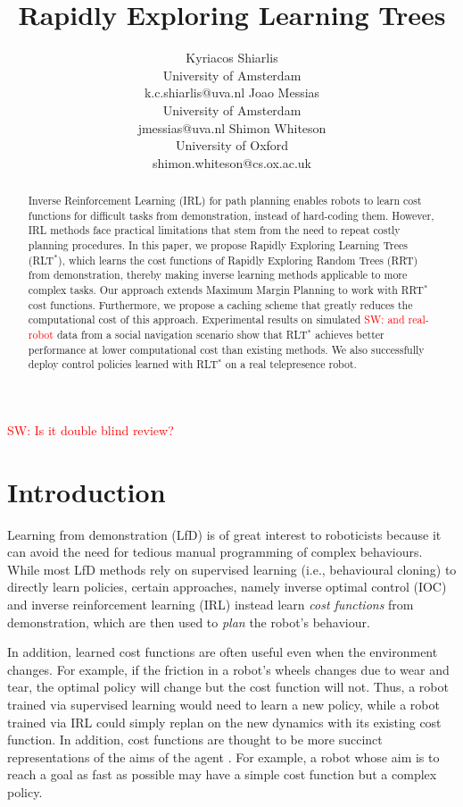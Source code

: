 \documentclass{article}  %
\title{\LARGE \bf
Rapidly Exploring Learning Trees
}
\author{Kyriacos Shiarlis \\
University of Amsterdam \\
k.c.shiarlis@uva.nl
\And 
Joao Messias \\
University of Amsterdam \\ 
jmessias@uva.nl 
\And
Shimon Whiteson \\
University of Oxford \\
shimon.whiteson@cs.ox.ac.uk 
}
\newcommand{\sw}[1]{\textcolor{red}{SW: #1}}
\begin{document}
\maketitle

\sw{Is it double blind review?}

\thispagestyle{empty}
\pagestyle{empty}


\begin{abstract}
Inverse Reinforcement Learning (IRL) for path planning enables robots to learn cost functions for difficult tasks from demonstration, instead of hard-coding them. However, IRL methods face practical limitations that stem from the need to repeat costly planning procedures.
In this paper, we propose Rapidly Exploring Learning Trees (RLT$^*$), which learns the cost functions of Rapidly Exploring Random Trees (RRT) from demonstration, thereby making inverse learning methods applicable to more complex tasks. Our approach extends Maximum Margin Planning to work with RRT$^*$ cost functions. Furthermore, we propose a caching scheme that greatly reduces the computational cost of this approach. Experimental results on simulated \sw{and real-robot} data from a social navigation scenario show that RLT$^*$ achieves better performance at lower computational cost than existing methods.  We also successfully deploy control policies learned with RLT$^*$ on a real telepresence robot.


\end{abstract}


\section{Introduction}

Learning from demonstration (LfD) \cite{argall2009survey} is of great interest to roboticists because it can avoid the need for tedious manual programming of complex behaviours. While most LfD methods rely on supervised learning (i.e., behavioural cloning) to directly learn policies, certain approaches, namely inverse optimal control (IOC) \cite{kalman1964linear} and inverse reinforcement learning (IRL) \cite{abbeel2004apprenticeship} instead learn \emph{cost functions} from demonstration, which are then used to \emph{plan} the robot's behaviour. 

In addition, learned cost functions are often useful even when the environment changes.  For example, if the friction in a robot's wheels changes due to wear and tear, the optimal policy will change but the cost function will not. Thus, a robot trained via supervised learning would need to learn a new policy, while a robot trained via IRL could simply replan on the new dynamics with its existing cost function. In addition, cost functions are thought to be more succinct representations of the aims of the agent \cite{abbeel2004apprenticeship}. For example, a robot whose aim is to reach a goal as fast as possible may have a simple cost function but a complex policy. 
\end{document}
